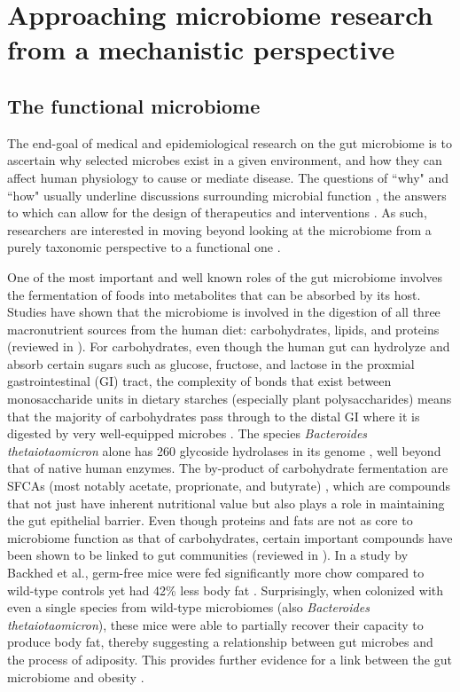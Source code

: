 \section{Approaching microbiome research from a mechanistic perspective}

\subsection{The functional microbiome}

The end-goal of medical and epidemiological research on the gut microbiome is to ascertain why selected microbes exist in a given environment, and how they can affect human physiology to cause or mediate disease. The questions of ``why" and ``how" usually underline discussions surrounding microbial function \cite{klassen2018defining}, the answers to which can allow for the design of therapeutics and interventions \cite{durack2019gut}. As such, researchers are interested in moving beyond looking at the microbiome from a purely taxonomic perspective to a functional one \cite{heinz-buschart2018human}.  

One of the most important and well known roles of the gut microbiome involves the fermentation of foods into metabolites that can be absorbed by its host. Studies have shown that the microbiome is involved in the digestion of all three macronutrient sources from the human diet: carbohydrates, lipids, and proteins (reviewed in \cite{oliphant2019macronutrient}). For carbohydrates, even though the human gut can hydrolyze and absorb certain sugars such as glucose, fructose, and lactose in the proxmial gastrointestinal (GI) tract, the complexity of bonds that exist between monosaccharide units in dietary starches (especially plant polysaccharides) means that the majority of carbohydrates pass through to the distal GI where it is digested by very well-equipped microbes \cite{wong2006colonic}. The species \emph{Bacteroides thetaiotaomicron} alone has 260 glycoside hydrolases in its genome \cite{xu2003genomic}, well beyond that of native human enzymes. The by-product of carbohydrate fermentation are SFCAs (most notably acetate, proprionate, and butyrate) \cite{macfarlane2012bacteria}, which are compounds that not just have inherent nutritional value but also plays a role in maintaining the gut epithelial barrier. Even though proteins and fats are not as core to microbiome function as that of carbohydrates, certain important compounds have been shown to be linked to gut communities (reviewed in \cite{morowitz2011contributions}). In a study by Backhed et al., germ-free mice were fed significantly more chow compared to wild-type controls yet had 42\% less body fat \cite{backhed2004gut}. Surprisingly, when colonized with even a single species from wild-type microbiomes (also \emph{Bacteroides thetaiotaomicron}), these mice were able to partially recover their capacity to produce body fat, thereby suggesting a relationship between gut microbes and the process of adiposity. This provides further evidence for a link between the gut microbiome and obesity \cite{turnbaugh2009core}. 

